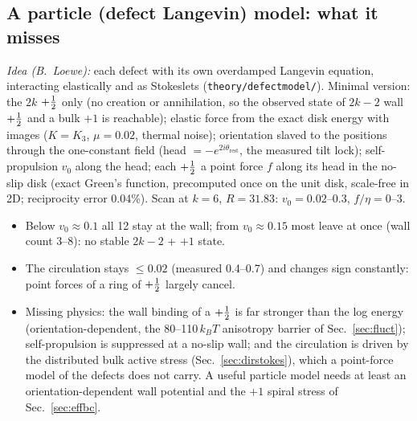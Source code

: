 \subsection{A particle (defect Langevin) model: what it misses}\label{sec:defectmodel}
\emph{Idea (B.~Loewe):} each defect with its own overdamped Langevin equation, interacting elastically and as Stokeslets
(\texttt{theory/defectmodel/}). Minimal version: the $2k$ $+\tfrac12$ only (no creation or annihilation, so the observed state of $2k-2$ wall $+\tfrac12$ and a
bulk $+1$ is reachable); elastic force from the exact disk energy with images ($K=K_3$, $\mu=0.02$, thermal noise); orientation slaved to the positions
through the one-constant field (head $=-e^{2i\theta_\mathrm{rest}}$, the measured tilt lock); self-propulsion $v_0$ along the head; each $+\tfrac12$ a
point force $f$ along its head in the no-slip disk (exact Green's function, precomputed once on the unit disk, scale-free in 2D; reciprocity error 0.04\%).
Scan at $k=6$, $R=31.83$: $v_0=0.02$--0.3, $f/\eta=0$--3.
\begin{itemize}
  \item Below $v_0\approx0.1$ all 12 stay at the wall; from $v_0\approx0.15$ most leave at once (wall count 3--8): no stable $2k-2$ + $+1$ state.
  \item The circulation stays $\le0.02$ (measured 0.4--0.7) and changes sign constantly: point forces of a ring of $+\tfrac12$ largely cancel.
  \item Missing physics: the wall binding of a $+\tfrac12$ is far stronger than the log energy (orientation-dependent, the 80--110\,$k_BT$ anisotropy barrier of
        Sec.~\ref{sec:fluct}); self-propulsion is suppressed at a no-slip wall; and the circulation is driven by the distributed bulk active stress
        (Sec.~\ref{sec:dirstokes}), which a point-force model of the defects does not carry. A useful particle model needs at least an orientation-dependent
        wall potential and the $+1$ spiral stress of Sec.~\ref{sec:effbc}.
\end{itemize}

